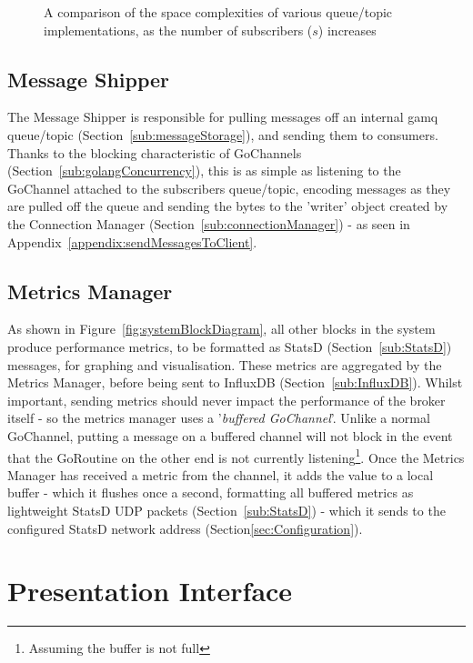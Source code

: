 \begin{figure}[H]
  \centering
  
  \caption{A comparison of the space complexities of various queue/topic
           implementations, as the number of subscribers ($s$) increases}
  \label{fig:tikz:implementationSpaceComplexityGraph}
\end{figure}

\subsection{Message Shipper}
\label{sub:Message Shipper}

The Message Shipper is responsible for pulling messages off an internal gamq
queue/topic (Section~\ref{sub:messageStorage}), and sending them to consumers.
Thanks to the blocking characteristic of GoChannels
(Section~\ref{sub:golangConcurrency}), this is as simple as listening to the
GoChannel attached to the subscribers queue/topic, encoding messages as they are
pulled off the queue and sending the bytes to the 'writer' object created by
the Connection Manager (Section~\ref{sub:connectionManager}) - as seen in
Appendix~\ref{appendix:sendMessagesToClient}.

\subsection{Metrics Manager}
\label{sub:Metrics Manager}

As shown in Figure~\ref{fig:systemBlockDiagram}, all other blocks in the system
produce performance metrics, to be formatted as StatsD
(Section~\ref{sub:StatsD}) messages, for graphing and visualisation. These
metrics are aggregated by the Metrics Manager, before being sent to InfluxDB
(Section~\ref{sub:InfluxDB}). Whilst important, sending metrics should never
impact the performance of the broker itself - so the metrics manager uses a
'\emph{buffered GoChannel}'\cite{channelsInGo}. Unlike a normal GoChannel,
putting a message on a buffered channel will not block in the event that the
GoRoutine on the other end is not currently listening\footnote{Assuming the
buffer is not full}. Once the Metrics Manager has received a metric from the
channel, it adds the value to a local buffer - which it flushes once a second,
formatting all buffered metrics as lightweight StatsD UDP packets
(Section~\ref{sub:StatsD}) - which it sends to the configured StatsD network
address (Section\ref{sec:Configuration}).

\section{Presentation Interface}
\label{sec:presentationInterface}

